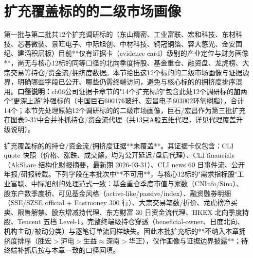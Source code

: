 \section{扩充覆盖标的的二级市场画像}

第一批与第二批共12个扩充调研标的（东山精密、工业富联、宏和科技、东材科技、芯碁微装、景旺电子、中际旭创、中材科技、铜冠铜箔、容大感光、金安国纪、建滔积层板）目前**仅有证据卡（evidence card）级别的产业定位与财务画像**，尚无与核心12标的同等口径的北向季度持股、基金重仓、融资盘、龙虎榜、大宗交易等持仓/资金流/拥挤度数据。本节给出这12个标的的二级市场画像与证据边界，明确哪些字段已公开、哪些仍需终端访问，避免与核心标的的拥挤度排序混用。\textbf{口径说明：}ch06公司证据卡章节的"14个扩充标的"包含此处12个调研标的\textbf{加}两个"更深上游"补强标的（中国巨石600176玻纤、宏昌电子603002环氧树脂），合计14个；本节先处理原始12个调研标的的二级市场画像，巨石/宏昌作为第三批扩充在图表9-37中合并补抓持仓/资金流代理（共13只A股五维代理，详见代理覆盖升级说明）。

\begin{sourcequalitybox}
扩充覆盖标的的持仓/资金流/拥挤度证据**未覆盖**。其证据卡仅包含：CLI quote 快照（价格、涨跌、成交额，均为公开延迟/盘后代理）、CLI financials（AkShare 结构化财报摘要，最新期 2026-03-31）、CLI news 60 日事件流、公开年报/研报转载。下列字段在本批次中**不可用**，与核心12标的"需求指标股"工业富联、中际旭创的处理范式一致：基金重仓季度市值与家数（CNInfo/Sina）、股东户数季度桥、可见基金风格（active-like/passive/index）、融资融券明细（SSE/SZSE official + Eastmoney 300 行）、大宗交易笔数/折价、龙虎榜净买卖、限售解禁、股东增减持代理、东方财富 30 日资金流代理、HKEX 北向季度持股、Tencent 五档 Level-1。完整终端级持仓穿透（beneficial-owner、日度北向、机构主动/被动分类）与逐笔订单流同样缺失。因此本批扩充标的**不纳入本章拥挤度排序（胜宏$>$沪电$>$生益$\approx$深南$>$华正），仅作画像与证据边界披露**；待终端补抓后按与本章一致的口径回填。
\end{sourcequalitybox}


